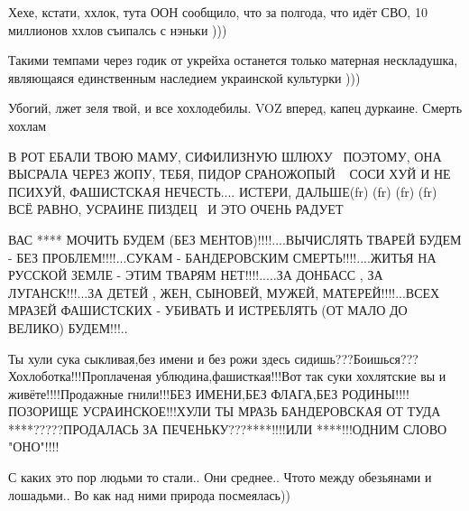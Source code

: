 
Хехе, кстати, ххлок, тута ООН сообщило, что за полгода, что идёт СВО, 10 миллионов ххлов съипалсь с нэньки )))

Такими темпами через годик от укрейха останется только матерная нескладушка,
являющаяся единственным наследием украинской культурки )))


Убогий, лжет зеля твой, и все хохлодебилы. VOZ вперед, капец дуркаине. Смерть
хохлам


В РОТ ЕБАЛИ ТВОЮ МАМУ, СИФИЛИЗНУЮ ШЛЮХУ🤣🤣🤣ПОЭТОМУ, ОНА ВЫСРАЛА ЧЕРЕЗ ЖОПУ,
ТЕБЯ, ПИДОР СРАНОЖОПЫЙ🤣🤣🤣🤣СОСИ ХУЙ И НЕ ПСИХУЙ, ФАШИСТСКАЯ НЕЧЕСТЬ....
ИСТЕРИ, ДАЛЬШЕ(fr) (fr) (fr) (fr) ВСЁ РАВНО, УСРАИНЕ ПИЗДЕЦ🤣🤣🤣И ЭТО ОЧЕНЬ
РАДУЕТ🤣🤣🤣🤣🤣🤣


ВАС **** МОЧИТЬ БУДЕМ (БЕЗ МЕНТОВ)!!!!....ВЫЧИСЛЯТЬ ТВАРЕЙ БУДЕМ - БЕЗ
ПРОБЛЕМ!!!!...СУКАМ - БАНДЕРОВСКИМ СМЕРТЬ!!!!....ЖИТЬЯ НА РУССКОЙ ЗЕМЛЕ - ЭТИМ
ТВАРЯМ НЕТ!!!!.....ЗА ДОНБАСС , ЗА ЛУГАНСК!!!...ЗА ДЕТЕЙ , ЖЕН, СЫНОВЕЙ, МУЖЕЙ,
МАТЕРЕЙ!!!!...ВСЕХ МРАЗЕЙ ФАШИСТСКИХ - УБИВАТЬ И ИСТРЕБЛЯТЬ (ОТ МАЛО ДО ВЕЛИКО)
БУДЕМ!!!..


Ты хули сука сыкливая,без имени и без рожи здесь
сидишь???Боишься???Хохлоботка!!!Проплаченая ублюдина,фашисткая!!!Вот так суки
хохлятские вы и живёте!!!!Продажные гнили!!!БЕЗ ИМЕНИ,БЕЗ ФЛАГА,БЕЗ
РОДИНЫ!!!!ПОЗОРИЩЕ УСРАИНСКОЕ!!!ХУЛИ ТЫ МРАЗЬ БАНДЕРОВСКАЯ ОТ ТУДА
****?????ПРОДАЛАСЬ ЗА ПЕЧЕНЬКУ???****!!!!ИЛИ ****!!!ОДНИМ СЛОВО "ОНО"!!!!


С каких это пор людьми то стали.. Они среднее.. Чтото между обезьянами и
лошадьми.. Во как над ними природа посмеялась))



